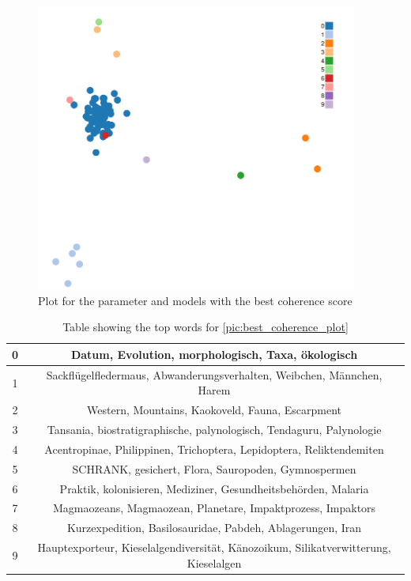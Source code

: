 \begin{figure}[t]
	\centering
	\includegraphics[width=400px]{../chapters/implementation/pics/best_coherence_plot}
	\caption{\label{pic:best_coherence_plot} Plot for the parameter and models with the best coherence score}
\end{figure}

\begin{table}
	\centering
	\begin{tabular}{c | c}
		0 & Datum, Evolution, morphologisch, Taxa, ökologisch \\ \hline
		1 & Sackflügelfledermaus, Abwanderungsverhalten, Weibchen, Männchen, Harem \\ \hline
		2 & Western, Mountains, Kaokoveld, Fauna, Escarpment \\ \hline
		3 & Tansania, biostratigraphische, palynologisch, Tendaguru, Palynologie \\ \hline
		4 & Acentropinae, Philippinen, Trichoptera, Lepidoptera, Reliktendemiten \\ \hline
		5 & SCHRANK, gesichert, Flora, Sauropoden, Gymnospermen \\ \hline
		6 & Praktik, kolonisieren, Mediziner, Gesundheitsbehörden, Malaria \\ \hline
		7 & Magmaozeans, Magmaozean, Planetare, Impaktprozess, Impaktors \\ \hline
		8 & Kurzexpedition, Basilosauridae, Pabdeh, Ablagerungen, Iran \\ \hline
		9 & Hauptexporteur, Kieselalgendiversität, Känozoikum, Silikatverwitterung, Kieselalgen \\ \hline
	\end{tabular}
	\caption{\label{tab:best_coherence_table} Table showing the top words for {\autoref{pic:best_coherence_plot}}}
\end{table}

